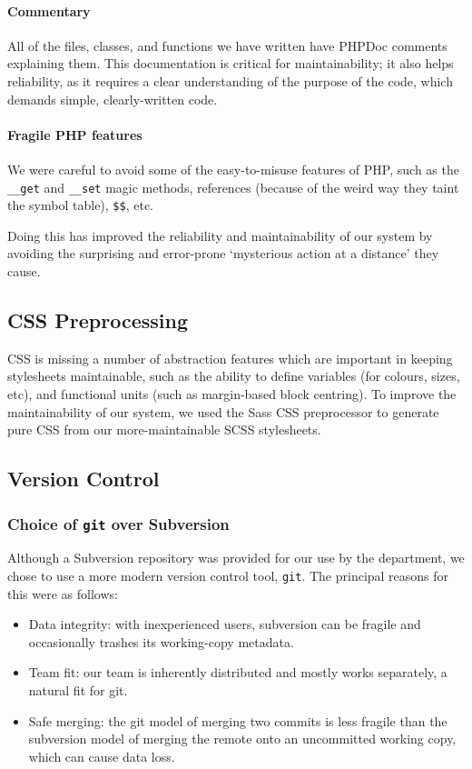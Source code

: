 \paragraph{Commentary}
All of the files, classes, and functions we have written have PHPDoc
comments explaining them. This documentation is critical for
maintainability; it also helps reliability, as it requires a clear
understanding of the purpose of the code, which demands simple,
clearly-written code.

\paragraph{Fragile PHP features}
We were careful to avoid some of the easy-to-misuse features of PHP,
such as the \verb!__get! and \verb!__set! magic methods, references
(because of the weird way they taint the symbol table), \verb!$$!, etc.

Doing this has improved the reliability and maintainability of our
system by avoiding the surprising and error-prone `mysterious action
at a distance' they cause.

\subsection{CSS Preprocessing}

CSS is missing a number of abstraction features which are important in
keeping stylesheets maintainable, such as the ability to define
variables (for colours, sizes, etc), and functional units (such as
margin-based block centring). To improve the maintainability of our
system, we used the Sass CSS preprocessor\cite{Scss} to generate
pure CSS from our more-maintainable SCSS stylesheets.

\subsection{Version Control}

\subsubsection{Choice of \texttt{git} over Subversion}

Although a Subversion repository was provided for our use by the
department, we chose to use a more modern version control tool,
\texttt{git}. The principal reasons for this were as follows:

\begin{itemize}
\item Data integrity: with inexperienced users, subversion can be
  fragile and occasionally trashes its working-copy metadata.
\item Team fit: our team is inherently distributed and mostly works
  separately, a natural fit for git.
\item Safe merging: the git model of merging two commits is less
  fragile than the subversion model of merging the remote onto an
  uncommitted working copy, which can cause data loss.
\end{itemize}

